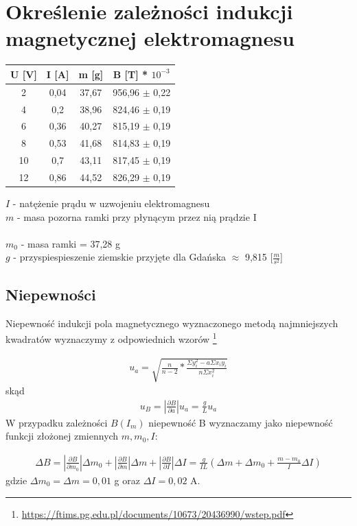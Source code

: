 \documentclass{article}
\begin{document}
\section{Określenie zależności indukcji magnetycznej elektromagnesu}

\begin{center}
  \begin{tabular}{ c | c | c | c}
  U [V] & I [A] & m [g] & B [T] * $10^{-3}$\\
  \hline
  2 & 0,04 & 37,67 & 956,96 $\pm$ 0,22\\
  4 & 0,2 & 38,96 & 824,46 $\pm$ 0,19\\
  6 & 0,36 & 40,27 & 815,19 $\pm$ 0,19\\
  8 & 0,53 & 41,68 & 814,83 $\pm$ 0,19\\
  10 & 0,7 & 43,11 & 817,45 $\pm$ 0,19\\
  12 & 0,86 & 44,52 & 826,29 $\pm$ 0,19\\
  \end{tabular}
\end{center}

$I$ - natężenie prądu w uzwojeniu elektromagnesu \\
$m$ - masa pozorna ramki przy płynącym przez nią prądzie I \\\\
$m_0$ - masa ramki = 37,28 g\\
$g$ - przyspiespieszenie ziemskie przyjęte dla Gdańska $\approx$ 9,815 [$\frac{m}{s^2}$]

\subsection{Niepewności}
Niepewność indukcji pola magnetycznego wyznaczonego metodą najmniejszych kwadratów wyznaczymy z odpowiednich wzorów  \footnote{\url{https://ftims.pg.edu.pl/documents/10673/20436990/wstep.pdf}}\:

\begin{gather*}
		u_a = \sqrt{\frac{n}{n-2} * \frac{\Sigma y_i^2 - a\Sigma x_iy_i}{n\Sigma x_i^2}} 
\end{gather*}
skąd
\begin{gather*}
		u_B= |\frac{\partial B}{\partial a}| u_a = \frac{g}{L}u_a
\end{gather*}
W przypadku zależności $B(I_m)$ niepewność B wyznaczamy jako niepewność funkcji złożonej zmiennych 
$m, m_0, I$:

\begin{gather*}
		\Delta B = |\frac{\partial B}{\partial m_0}|\Delta m_0 + |\frac{\partial B}{\partial m}|\Delta m + |\frac{\partial B}{\partial I}|\Delta I = \frac{g}{IL}(\Delta m + \Delta m_0 + \frac{m-m_0}{I}\Delta I)
\end{gather*}
gdzie $\Delta m_0 =\Delta m = 0,01$ g oraz $\Delta I = 0,02$ A.
\end{document}
